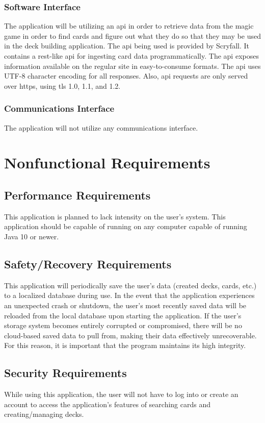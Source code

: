 \documentclass[12pt]{report}
\newcommand{\javaversion}{10 }
\begin{document}
\subsection{Software Interface}
The application will be utilizing an \acrshort{api} in order to retrieve data from the \gls{magic} game in order to find cards and figure out what they do so that they may be used in the deck building application. The \acrshort{api} being used is provided by Scryfall. It contains a \gls{rest}-like \acrshort{api} for ingesting card data programmatically. The \acrshort{api} exposes information available on the regular site in easy-to-consume formats. The \acrshort{api} uses UTF-8 character encoding for all responses. Also, \acrshort{api} requests are only served over \gls{https}, using \acrshort{tls} 1.0, 1.1, and 1.2.
\subsection{Communications Interface}
The application will not utilize any communications interface.
\chapter{Nonfunctional Requirements}
\section{Performance Requirements}
This application is planned to lack intensity on the user’s system. This application should be capable of running on any computer capable of running Java \javaversion or newer.
\section{Safety/Recovery Requirements}
This application will periodically save the user’s data (created decks, cards, etc.) 
to a localized database during use. In the event that the application 
experiences an unexpected crash or shutdown, the user’s most recently saved
data will be reloaded from the local database upon starting the application.
If the user’s storage system becomes entirely corrupted or compromised, there 
will be no cloud-based saved data to pull from, making their data effectively unrecoverable. For this reason, it is important that the program maintains its high integrity.
\section{Security Requirements}
While using this application, the user will not have to log into or create an 
account to access the application’s features of searching cards and creating/managing decks.
\end{document}
